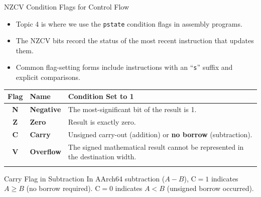 \documentclass[aspectratio=169,11pt,t]{beamer}
\newcommand{\key}[1]{\textbf{#1}}
\newcommand{\bits}[1]{\texttt{#1}}
\newcommand{\code}[1]{\texttt{#1}}
\begin{document}
\begin{frame}{NZCV Condition Flags for Control Flow}

\begin{itemize}\setlength{\itemsep}{5pt}
  \item Topic 4 is where we use the \bits{pstate} condition flags in assembly programs.
  \item The NZCV bits record the status of the most recent instruction that updates them.
  \item Common flag-setting forms include instructions with an ``\code{s}'' suffix and explicit comparisons.
\end{itemize}

\vspace{-0.2cm}
\begin{center}
\small
\setlength{\tabcolsep}{6pt}
\begin{tabular}{cll}
\toprule
\textbf{Flag} & \textbf{Name} & \textbf{Condition Set to 1} \\
\midrule
\key{N} & \textbf{Negative} & The most-significant bit of the result is 1. \\
\key{Z} & \textbf{Zero}     & Result is exactly zero. \\
\key{C} & \textbf{Carry}    & Unsigned carry-out (addition) or \key{no borrow} (subtraction). \\
\key{V} & \textbf{Overflow} & The signed mathematical result cannot be represented in the destination width. \\
\bottomrule
\tabularnewline
\end{tabular}
\end{center}

\vspace{-0.5cm}
\begin{block}{Carry Flag in Subtraction}
In AArch64 subtraction ($A - B$), $\text{C} = 1$ indicates $A \ge B$ (no borrow required). $\text{C} = 0$ indicates $A < B$ (unsigned borrow occurred).
\end{block}
\end{frame}





\end{document}
